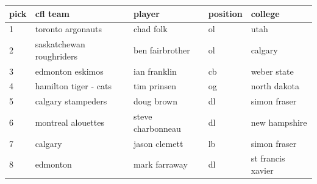 \documentclass{article}
\begin{document}
\begin{tabular}{lllll}
\toprule
pick & cfl team & player & position & college \\
\midrule
1 & toronto argonauts & chad folk & ol & utah \\
2 & saskatchewan roughriders & ben fairbrother & ol & calgary \\
3 & edmonton eskimos & ian franklin & cb & weber state \\
4 & hamilton tiger - cats & tim prinsen & og & north dakota \\
5 & calgary stampeders & doug brown & dl & simon fraser \\
6 & montreal alouettes & steve charbonneau & dl & new hampshire \\
7 & calgary & jason clemett & lb & simon fraser \\
8 & edmonton & mark farraway & dl & st francis xavier \\
\bottomrule
\end{tabular}
\end{document}
